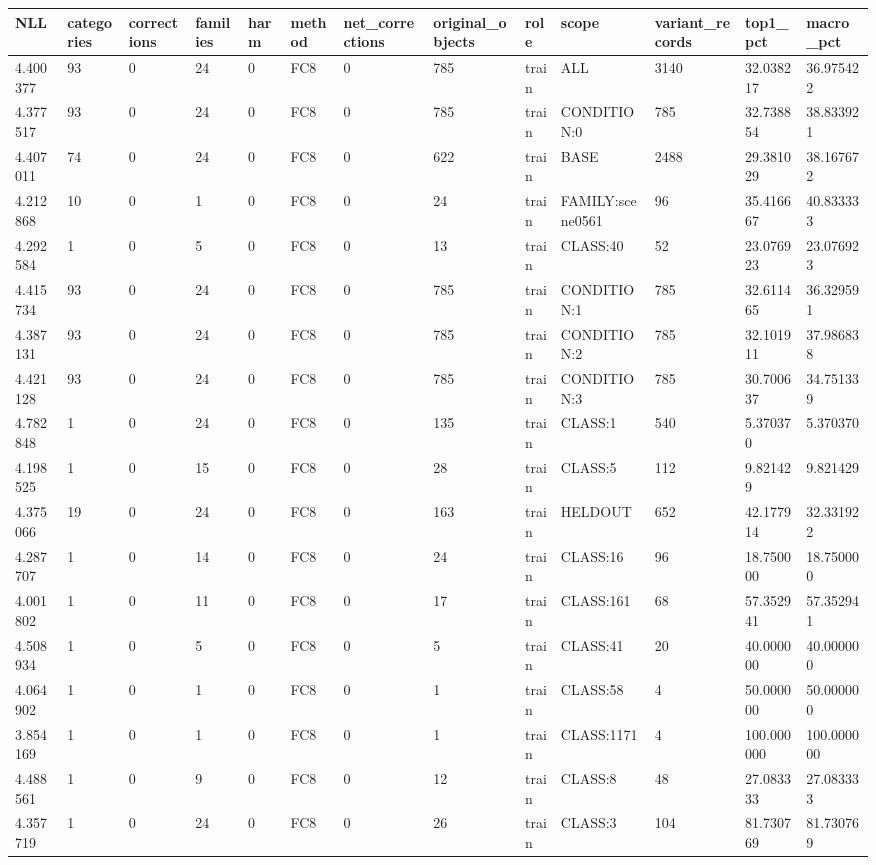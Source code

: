 \begin{tabular}{lllllllllllll}
\toprule
NLL & categories & corrections & families & harm & method & net\_corrections & original\_objects & role & scope & variant\_records & top1\_pct & macro\_pct \\
\midrule
4.400377 & 93 & 0 & 24 & 0 & FC8 & 0 & 785 & train & ALL & 3140 & 32.038217 & 36.975422 \\
4.377517 & 93 & 0 & 24 & 0 & FC8 & 0 & 785 & train & CONDITION:0 & 785 & 32.738854 & 38.833921 \\
4.407011 & 74 & 0 & 24 & 0 & FC8 & 0 & 622 & train & BASE & 2488 & 29.381029 & 38.167672 \\
4.212868 & 10 & 0 & 1 & 0 & FC8 & 0 & 24 & train & FAMILY:scene0561 & 96 & 35.416667 & 40.833333 \\
4.292584 & 1 & 0 & 5 & 0 & FC8 & 0 & 13 & train & CLASS:40 & 52 & 23.076923 & 23.076923 \\
4.415734 & 93 & 0 & 24 & 0 & FC8 & 0 & 785 & train & CONDITION:1 & 785 & 32.611465 & 36.329591 \\
4.387131 & 93 & 0 & 24 & 0 & FC8 & 0 & 785 & train & CONDITION:2 & 785 & 32.101911 & 37.986838 \\
4.421128 & 93 & 0 & 24 & 0 & FC8 & 0 & 785 & train & CONDITION:3 & 785 & 30.700637 & 34.751339 \\
4.782848 & 1 & 0 & 24 & 0 & FC8 & 0 & 135 & train & CLASS:1 & 540 & 5.370370 & 5.370370 \\
4.198525 & 1 & 0 & 15 & 0 & FC8 & 0 & 28 & train & CLASS:5 & 112 & 9.821429 & 9.821429 \\
4.375066 & 19 & 0 & 24 & 0 & FC8 & 0 & 163 & train & HELDOUT & 652 & 42.177914 & 32.331922 \\
4.287707 & 1 & 0 & 14 & 0 & FC8 & 0 & 24 & train & CLASS:16 & 96 & 18.750000 & 18.750000 \\
4.001802 & 1 & 0 & 11 & 0 & FC8 & 0 & 17 & train & CLASS:161 & 68 & 57.352941 & 57.352941 \\
4.508934 & 1 & 0 & 5 & 0 & FC8 & 0 & 5 & train & CLASS:41 & 20 & 40.000000 & 40.000000 \\
4.064902 & 1 & 0 & 1 & 0 & FC8 & 0 & 1 & train & CLASS:58 & 4 & 50.000000 & 50.000000 \\
3.854169 & 1 & 0 & 1 & 0 & FC8 & 0 & 1 & train & CLASS:1171 & 4 & 100.000000 & 100.000000 \\
4.488561 & 1 & 0 & 9 & 0 & FC8 & 0 & 12 & train & CLASS:8 & 48 & 27.083333 & 27.083333 \\
4.357719 & 1 & 0 & 24 & 0 & FC8 & 0 & 26 & train & CLASS:3 & 104 & 81.730769 & 81.730769 \\

\end{tabular}

